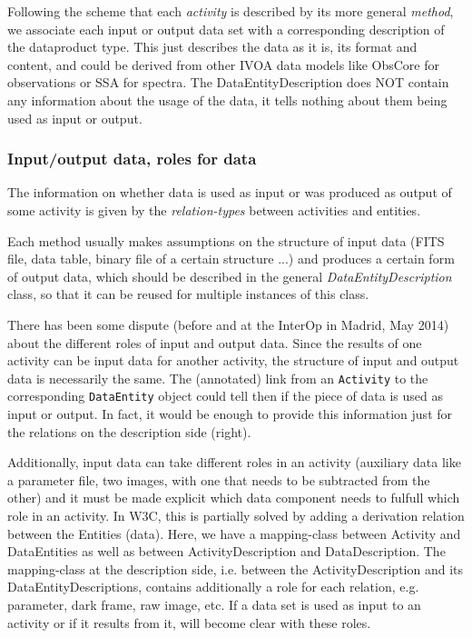 
Following the scheme that each \emph{activity} is described
by its more general \emph{method}, we associate each input or
output data set with a corresponding description of the dataproduct type. 
This just describes the data as it is, its format and content, and could be derived
from other IVOA data models like ObsCore for observations or SSA for spectra.
The DataEntityDescription does NOT contain any information about the usage of the data, 
it tells nothing about them being used as input or output.

\subsubsection{Input/output data, roles for data}
The information on whether data is used as input or was produced as output of 
some activity is given by the \emph{relation-types} between activities and entities.

Each method usually makes assumptions on the structure of input data (FITS file, data
table, binary file of a certain structure ...) and produces a certain form of
output data, which should be described in the general \emph{DataEntityDescription}
class, so that it can be reused for multiple instances of this class.

There has been some dispute (before and at the InterOp in Madrid, May 2014) 
about the different roles of input and output data. Since the results of one 
activity can be input data for
another activity, the structure of input and output data is necessarily the same.
The (annotated) link from an \texttt{Activity} to the corresponding \texttt{DataEntity}
object could tell then if the piece of data is used as input or output. In fact, 
it would be enough to provide this information just for the relations on the description side (right).

Additionally, input data can take different roles in an activity (auxiliary data like a parameter file, two images, with one that needs to be subtracted from the other) and it must be made explicit which data component needs to fulfull which role in an activity. 
In W3C, this is partially solved by adding a derivation relation between the Entities (data). Here, we have a mapping-class between Activity and DataEntities as well as between ActivityDescription and DataDescription. The mapping-class at the description side, i.e. between the ActivityDescription and its DataEntityDescriptions, contains additionally a role for each relation, e.g. parameter, dark frame, raw image, etc.  If a data set is used as input to an activity or if it results from it, will become clear with these roles.

